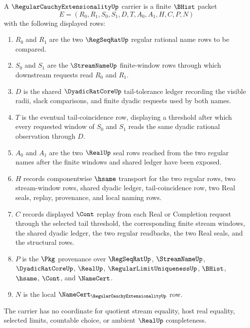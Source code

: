 \begin{definition}
\label{def:regular-cauchy-extensionality-carrier}
A $\RegularCauchyExtensionalityUp$ carrier is a finite $\BHist$ packet
$$
E=(R_0,R_1,S_0,S_1,D,T,A_0,A_1,H,C,P,N)
$$
with the following displayed rows:
\begin{enumerate}
\item $R_0$ and $R_1$ are the two $\RegSeqRatUp$ regular rational name rows to be compared.
\item $S_0$ and $S_1$ are the $\StreamNameUp$ finite-window rows through which downstream requests read $R_0$ and $R_1$.
\item $D$ is the shared $\DyadicRatCoreUp$ tail-tolerance ledger recording the visible radii, slack comparisons, and finite dyadic requests used by both names.
\item $T$ is the eventual tail-coincidence row, displaying a threshold after which every requested window of $S_0$ and $S_1$ reads the same dyadic rational observation through $D$.
\item $A_0$ and $A_1$ are the two $\RealUp$ seal rows reached from the two regular names after the finite windows and shared ledger have been exposed.
\item $H$ records componentwise $\hsame$ transport for the two regular rows, two stream-window rows, shared dyadic ledger, tail-coincidence row, two Real seals, replay, provenance, and local naming rows.
\item $C$ records displayed $\Cont$ replay from each Real or Completion request through the selected tail threshold, the corresponding finite stream windows, the shared dyadic ledger, the two regular readbacks, the two Real seals, and the structural rows.
\item $P$ is the $\Pkg$ provenance over $\RegSeqRatUp$, $\StreamNameUp$, $\DyadicRatCoreUp$, $\RealUp$, $\RegularLimitUniquenessUp$, $\BHist$, $\hsame$, $\Cont$, and $\NameCert$.
\item $N$ is the local $\NameCert_{\RegularCauchyExtensionalityUp}$ row.
\end{enumerate}
The carrier has no coordinate for quotient stream equality, host real equality, selected limits, countable choice, or ambient $\RealUp$ completeness.
\end{definition}

